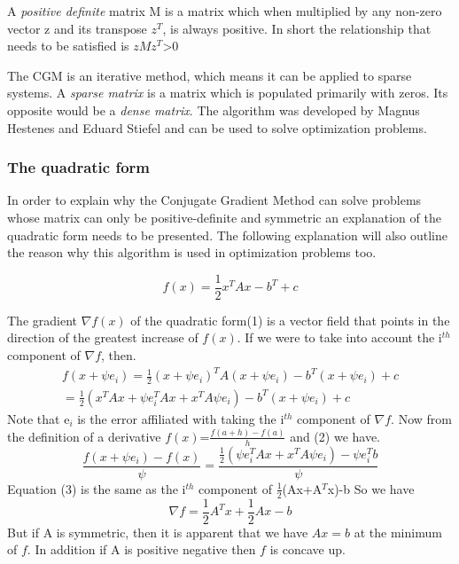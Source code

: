 \documentclass[12pt,a4paper]{article}
\begin{document}
A \emph{positive definite} matrix M is a matrix which when multiplied by any non-zero vector z and its transpose $z^T$, is always positive. In short the relationship that needs to be satisfied is $zMz^T$>0

The CGM is an iterative method, which means it can be applied to sparse systems. A \emph{sparse matrix} is a matrix which is populated primarily with zeros. Its opposite would be a \emph{dense matrix}. The algorithm was developed by Magnus Hestenes and Eduard Stiefel and can be used to solve optimization problems\cite{press2007numerical}.
\subsubsection{The quadratic form}
In order to explain why the Conjugate Gradient Method can solve problems whose matrix can only be positive-definite and symmetric an explanation of the quadratic form needs to be presented. The following explanation will also outline the reason why this algorithm is used in optimization problems too.
\begin{center}
\begin{equation}
f(x)=\frac{1}{2}x^TAx-b^T+c
\end{equation}
\end{center}

The gradient $\nabla f(x)$ of the quadratic form(1) is a vector field that points in the direction of the greatest increase of $f(x)$. If we were to take into account the i$^{th}$ component of $\nabla f$, then.
\begin{equation}
\begin{split}
f(x+\psi e_i)= \frac{1}{2} (x+\psi e_i)^TA(x+\psi e_i)-b^T(x+\psi e_i)+c\\
= \frac{1}{2} (x^TAx+\psi e^T_iAx +x^TA\psi e_i)-b^T(x+\psi e_i)+c
\end{split}
\end{equation}
Note that e$_i$ is the error affiliated with taking the i$^{th}$ component of $\nabla f$. Now from the definition of a derivative $f(x)$=$\frac{f(a+h)-f(a)}{h}$ and (2) we have.
\begin{equation}
\frac{f(x+\psi e_i)-f(x)}{\psi}=\frac{\frac{1}{2}(\psi e^T_iAx+x^TA\psi e_i)-\psi e^T_ib}{\psi}
\end{equation}
Equation (3) is the same as the i$^{th}$ component of $\frac{1}{2}$(Ax+A$^T$x)-b
So we have
\begin{equation}
\nabla f =\frac{1}{2}A^Tx+\frac{1}{2}Ax-b
\end{equation}
But if A is symmetric, then it is apparent that we have $Ax=b$ at the minimum of $f$. In addition if A is positive negative then $f$ is concave up. 
\end{document}
